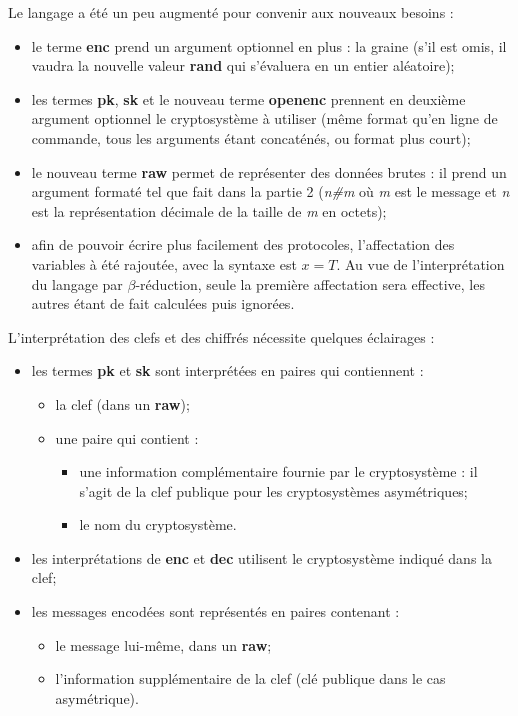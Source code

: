 \documentclass[11pt]{article} %
\begin{document}
Le langage a été un peu augmenté pour convenir aux nouveaux besoins :
\begin{itemize}
  \item le terme \textbf{enc} prend un argument optionnel en plus : la graine (s'il est omis, il vaudra la nouvelle valeur \textbf{rand} qui s'évaluera en un entier aléatoire);
  \item les termes \textbf{pk}, \textbf{sk} et le nouveau terme \textbf{openenc} prennent en deuxième argument optionnel le cryptosystème à utiliser (même format qu'en ligne de commande, tous les arguments étant concaténés, ou format plus court);
  \item le nouveau terme \textbf{raw} permet de représenter des données brutes : il prend un argument formaté tel que fait dans la partie 2 (\emph{n\#m} où \emph{m} est le message et \emph{n} est la représentation décimale de la taille de \emph{m} en octets);
  \item afin de pouvoir écrire plus facilement des protocoles, l'affectation des variables à été rajoutée, avec la syntaxe est $x=T$. Au vue de l'interprétation du langage par $\beta$-réduction, seule la première affectation sera effective, les autres étant de fait calculées puis ignorées.
\end{itemize}

L'interprétation des clefs et des chiffrés nécessite quelques éclairages :
\begin{itemize}
  \item les termes \textbf{pk} et \textbf{sk} sont interprétées en paires qui contiennent :
  \begin{itemize}
    \item la clef (dans un \textbf{raw});
    \item une paire qui contient :
    \begin{itemize}
      \item une information complémentaire fournie par le cryptosystème : il s'agit de la clef publique pour les cryptosystèmes asymétriques;
      \item le nom du cryptosystème.
    \end{itemize}
  \end{itemize}
  \item les interprétations de \textbf{enc} et \textbf{dec} utilisent le cryptosystème indiqué dans la clef;
  \item les messages encodées sont représentés en paires contenant :
  \begin{itemize}
  \item le message lui-même, dans un \textbf{raw};
  \item l'information supplémentaire de la clef (clé publique dans le cas asymétrique).
  \end{itemize}
\end{itemize}
\end{document}
